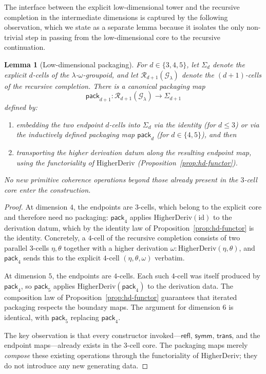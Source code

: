\documentclass[webpdf,traditional,large,numbered]{oup-authoring-template}
\theoremstyle{thmstyleone}%
\newtheorem{lemma}[theorem]{Lemma}
\theoremstyle{thmstyletwo}%
\theoremstyle{thmstylethree}%
\newcommand{\HigherDeriv}{\mathrm{HigherDeriv}}
\begin{document}
The interface between the explicit low-dimensional tower and the recursive
completion in the intermediate dimensions is captured by the following
observation, which we state as a separate lemma because it isolates the only
non-trivial step in passing from the low-dimensional core to the recursive
continuation.

\begin{lemma}[Low-dimensional packaging]\label{lem:packaging}
  For $d\in\{3,4,5\}$, let $\Sigma_d$ denote the explicit $d$-cells of the
  $\lambda$-$\omega$-groupoid, and let $\mathscr{R}_{d+1}(\mathscr{G}_\lambda)$
  denote the $(d+1)$-cells of the recursive completion.  There is a canonical
  \emph{packaging map}
  \[
    \mathsf{pack}_{d+1}:\mathscr{R}_{d+1}(\mathscr{G}_\lambda)
    \longrightarrow \Sigma_{d+1}
  \]
  defined by:
  \begin{enumerate}[label=(\alph*)]
    \item embedding the two endpoint $d$-cells into $\Sigma_d$ via the identity
      (for $d\le 3$) or via the inductively defined packaging map
      $\mathsf{pack}_d$ (for $d\in\{4,5\}$), and then
    \item transporting the higher derivation datum along the resulting endpoint
      map, using the functoriality of $\HigherDeriv$
      (Proposition~\textup{\ref{prop:hd-functor}}).
  \end{enumerate}
  No new primitive coherence operations beyond those already present in the
  $3$-cell core enter the construction.
\end{lemma}

\begin{proof}
  At dimension $4$, the endpoints are $3$-cells, which belong to the explicit
  core and therefore need no packaging: $\mathsf{pack}_4$ applies
  $\HigherDeriv(\mathrm{id})$ to the derivation datum, which by the identity law
  of Proposition~\ref{prop:hd-functor} is the identity.  Concretely, a $4$-cell
  of the recursive completion consists of two parallel $3$-cells $\eta,\theta$
  together with a higher derivation $\omega:\HigherDeriv(\eta,\theta)$, and
  $\mathsf{pack}_4$ sends this to the explicit $4$-cell $(\eta,\theta,\omega)$
  verbatim.

  At dimension $5$, the endpoints are $4$-cells.  Each such $4$-cell was itself
  produced by $\mathsf{pack}_4$, so $\mathsf{pack}_5$ applies
  $\HigherDeriv(\mathsf{pack}_4)$ to the derivation data.  The composition law
  of Proposition~\ref{prop:hd-functor} guarantees that iterated packaging
  respects the boundary maps.  The argument for dimension $6$ is identical, with
  $\mathsf{pack}_5$ replacing $\mathsf{pack}_4$.

  The key observation is that every constructor invoked---$\mathsf{refl}$,
  $\mathsf{symm}$, $\mathsf{trans}$, and the endpoint maps---already exists in
  the $3$-cell core.  The packaging maps merely \emph{compose} these existing
  operations through the functoriality of $\HigherDeriv$; they do not introduce
  any new generating data.
\end{proof}
\end{document}
